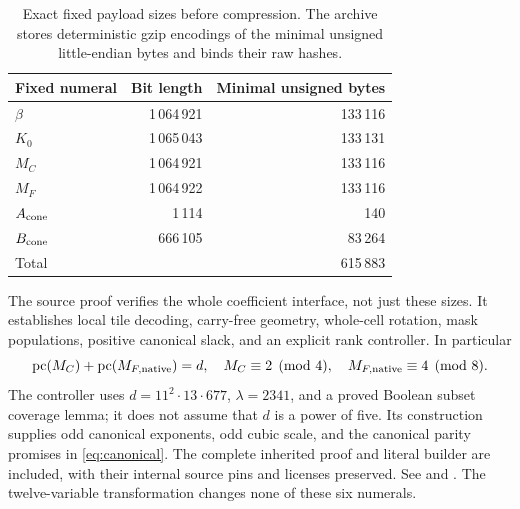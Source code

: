 \begin{table}[ht]\centering
\begin{tabular}{lrr}\toprule
Fixed numeral & Bit length & Minimal unsigned bytes\\\midrule
\(\beta\)&1\,064\,921&133\,116\\
\(K_0\)&1\,065\,043&133\,131\\
\(M_C\)&1\,064\,921&133\,116\\
\(M_F\)&1\,064\,922&133\,116\\
\(A_{\rm cone}\)&1\,114&140\\
\(B_{\rm cone}\)&666\,105&83\,264\\\midrule
Total&&615\,883\\\bottomrule
\end{tabular}
\caption{Exact fixed payload sizes before compression.
The archive stores deterministic gzip encodings of the minimal
unsigned little-endian bytes and binds their raw hashes.}
\end{table}

The source proof verifies the whole coefficient interface, not just
these sizes. It establishes local tile decoding, carry-free geometry,
whole-cell rotation, mask populations, positive canonical slack, and
an explicit rank controller. In particular
\[
\operatorname{pc}(M_C)+\operatorname{pc}(M_{F,\rm native})=d,\quad
M_C\equiv2\pmod4,\quad M_{F,\rm native}\equiv4\pmod8.
\]
The controller uses
\(d=11^2\cdot13\cdot677\), \(\lambda=2341\), and a proved Boolean
subset coverage lemma; it does not assume that \(d\) is a power of
five. Its construction supplies odd canonical exponents, odd cubic
scale, and the canonical parity promises in \eqref{eq:canonical}.
The complete inherited proof and literal builder are included,
with their internal source pins and licenses preserved. See
and
.
The twelve-variable transformation changes none of these six numerals.

